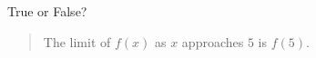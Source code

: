 \documentclass{ximera}
\author{Gregory Hartman \and Matthew Carr}
\begin{document}
\begin{exercise}



True or False? 
\begin{quote}
The limit of $f(x)$ as $x$ approaches $5$ is $f\left({5}\right)$.
\end{quote}
\begin{prompt}
\begin{multipleChoice}
\end{multipleChoice}
\end{prompt}

\end{exercise}
\end{document}
